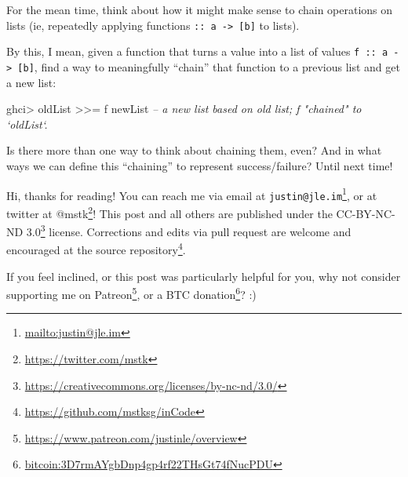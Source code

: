 \documentclass[]{article}
\newenvironment{Shaded}{}{}
\newcommand{\CommentTok}[1]{\textcolor[rgb]{0.38,0.63,0.69}{\textit{#1}}}
\newcommand{\FunctionTok}[1]{\textcolor[rgb]{0.02,0.16,0.49}{#1}}
\newcommand{\NormalTok}[1]{#1}
\renewcommand{\href}[2]{#2\footnote{\url{#1}}}
\begin{document}
For the mean time, think about how it might make sense to chain operations on
lists (ie, repeatedly applying functions
\texttt{::\ a\ -\textgreater{}\ {[}b{]}} to lists).

By this, I mean, given a function that turns a value into a list of values
\texttt{f\ ::\ a\ -\textgreater{}\ {[}b{]}}, find a way to meaningfully
``chain'' that function to a previous list and get a new list:

\begin{Shaded}
\begin{Highlighting}[]
\NormalTok{ghci}\FunctionTok{>}\NormalTok{ oldList }\FunctionTok{>>=}\NormalTok{ f}
\NormalTok{newList             }\CommentTok{-- a new list based on old list; f "chained" to `oldList`.}
\end{Highlighting}
\end{Shaded}

Is there more than one way to think about chaining them, even? And in what ways
we can define this ``chaining'' to represent success/failure? Until next time!

Hi, thanks for reading! You can reach me via email at
\href{mailto:justin@jle.im}{\nolinkurl{justin@jle.im}}, or at twitter at
\href{https://twitter.com/mstk}{@mstk}! This post and all others are published
under the \href{https://creativecommons.org/licenses/by-nc-nd/3.0/}{CC-BY-NC-ND
3.0} license. Corrections and edits via pull request are welcome and encouraged
at \href{https://github.com/mstksg/inCode}{the source repository}.

If you feel inclined, or this post was particularly helpful for you, why not
consider \href{https://www.patreon.com/justinle/overview}{supporting me on
Patreon}, or a \href{bitcoin:3D7rmAYgbDnp4gp4rf22THsGt74fNucPDU}{BTC donation}?
:)
\end{document}
